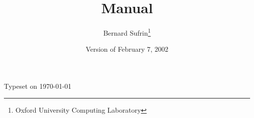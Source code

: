 \documentclass[11pt]{article}
\title{\LOGPRO Manual}
\author{Bernard Sufrin\thanks{Oxford University Computing Laboratory}}
\date{Version of February 7, 2002}
\begin{document}
\maketitle


Typeset on \today
\end{document}
